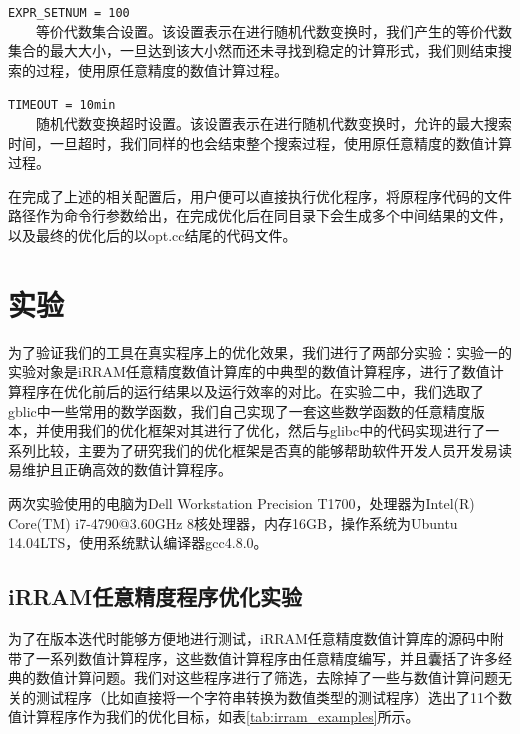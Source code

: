 \texttt{EXPR\_SETNUM = 100}\\
　　等价代数集合设置。该设置表示在进行随机代数变换时，我们产生的等价代数集合的最大大小，一旦达到该大小然而还未寻找到稳定的计算形式，我们则结束搜索的过程，使用原任意精度的数值计算过程。

\texttt{TIMEOUT = 10min}\\
　　随机代数变换超时设置。该设置表示在进行随机代数变换时，允许的最大搜索时间，一旦超时，我们同样的也会结束整个搜索过程，使用原任意精度的数值计算过程。


在完成了上述的相关配置后，用户便可以直接执行优化程序，将原程序代码的文件路径作为命令行参数给出，在完成优化后在同目录下会生成多个中间结果的文件，以及最终的优化后的以opt.cc结尾的代码文件。

\section{实验}

为了验证我们的工具在真实程序上的优化效果，我们进行了两部分实验：实验一的实验对象是iRRAM任意精度数值计算库的中典型的数值计算程序，进行了数值计算程序在优化前后的运行结果以及运行效率的对比。在实验二中，我们选取了gblic中一些常用的数学函数，我们自己实现了一套这些数学函数的任意精度版本，并使用我们的优化框架对其进行了优化，然后与glibc中的代码实现进行了一系列比较，主要为了研究我们的优化框架是否真的能够帮助软件开发人员开发易读易维护且正确高效的数值计算程序。

两次实验使用的电脑为Dell Workstation Precision T1700，处理器为Intel(R) Core(TM) i7-4790@3.60GHz 8核处理器，内存16GB，操作系统为Ubuntu 14.04LTS，使用系统默认编译器gcc4.8.0。

\subsection{iRRAM任意精度程序优化实验}

为了在版本迭代时能够方便地进行测试，iRRAM任意精度数值计算库的源码中附带了一系列数值计算程序，这些数值计算程序由任意精度编写，并且囊括了许多经典的数值计算问题。我们对这些程序进行了筛选，去除掉了一些与数值计算问题无关的测试程序（比如直接将一个字符串转换为数值类型的测试程序）选出了11个数值计算程序作为我们的优化目标，如表\ref{tab:irram_examples}所示。

